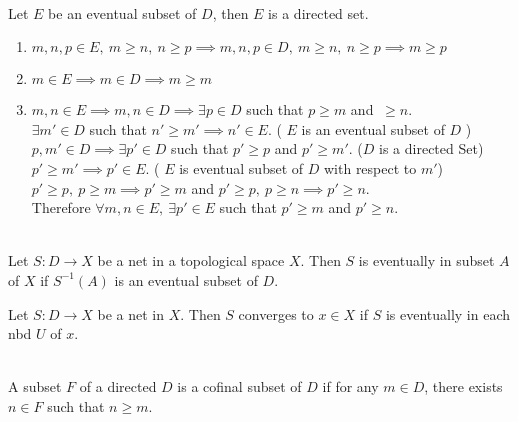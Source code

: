 \begin{remark}\cite[10.1.6]{joshi}\\
	Let $E$ be an eventual subset of $D$, then $E$ is a directed set.
	\begin{enumerate}
		\item $m,n,p \in E,\ m \ge n,\ n \ge p \implies m,n,p \in D,\ m \ge n,\ n \ge p \implies m \ge p$
		\item $m \in E \implies m \in D \implies m \ge m$
		\item $m,n \in E \implies m,n \in D \implies \exists p \in D$ such that $p \ge m$ and $\ \ge n$.\\

			$\exists m' \in D$ such that $n' \ge m' \implies n' \in E$.
			( $E$ is an eventual subset of $D$ )\\

			$p,m' \in D \implies \exists p' \in D$ such that $p' \ge p$ and $p' \ge m'$.
			($D$ is a directed Set)\\

			$p' \ge m' \implies p' \in E$.
			( $E$ is eventual subset of $D$ with respect to $m'$)\\

			$p' \ge p,\ p \ge m \implies p' \ge m$ and $p' \ge p,\ p \ge n \implies p' \ge n$.\\

			Therefore $\forall m,n \in E,\ \exists p' \in E$ such that $p' \ge m$ and $p' \ge n$.
	\end{enumerate}
\end{remark}

\begin{definition}\cite[10.1.5]{joshi}\\
	Let $S : D \to X$ be a net in a topological space $X$.
	Then $S$ is eventually in subset $A$ of $X$ if $S^{-1}(A)$ is an eventual subset of $D$.
\end{definition}

\begin{remark}
	Let $S : D \to X$ be a net in $X$.
	Then $S$ converges to $x \in X$ if $S$ is eventually in each nbd $U$ of $x$.
\end{remark}

\begin{definition}\cite[10.1.7]{joshi}\\
	A subset $F$ of a directed $D$ is a cofinal subset of $D$ if for any $m \in D$, there exists $n \in F$ such that $n \ge m$.
\end{definition}

